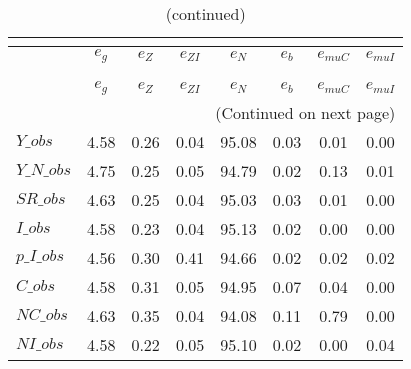  
\begin{center}
\begin{longtable}{lccccccc} 
\caption{VARIANCE DECOMPOSITION (in percent)}\\
 \label{Table:th_var_decomp_uncond}\\
\toprule 
$               $	 & 	 $        {e_g}$	 & 	 $        {e_Z}$	 & 	 $     {e_{ZI}}$	 & 	 $        {e_N}$	 & 	 $        {e_b}$	 & 	 $    {e_{muC}}$	 & 	 $    {e_{muI}}$\\
\midrule \endfirsthead 
\caption{(continued)}\\
 \toprule \\ 
$               $	 & 	 $        {e_g}$	 & 	 $        {e_Z}$	 & 	 $     {e_{ZI}}$	 & 	 $        {e_N}$	 & 	 $        {e_b}$	 & 	 $    {e_{muC}}$	 & 	 $    {e_{muI}}$\\
\midrule \endhead 
\midrule \multicolumn{8}{r}{(Continued on next page)} \\ \bottomrule \endfoot 
\bottomrule \endlastfoot 
$Y\_obs         $	 & 	         4.58	 & 	         0.26	 & 	         0.04	 & 	        95.08	 & 	         0.03	 & 	         0.01	 & 	         0.00 \\ 
$Y\_N\_obs      $	 & 	         4.75	 & 	         0.25	 & 	         0.05	 & 	        94.79	 & 	         0.02	 & 	         0.13	 & 	         0.01 \\ 
$SR\_obs        $	 & 	         4.63	 & 	         0.25	 & 	         0.04	 & 	        95.03	 & 	         0.03	 & 	         0.01	 & 	         0.00 \\ 
$I\_obs         $	 & 	         4.58	 & 	         0.23	 & 	         0.04	 & 	        95.13	 & 	         0.02	 & 	         0.00	 & 	         0.00 \\ 
$p\_I\_obs      $	 & 	         4.56	 & 	         0.30	 & 	         0.41	 & 	        94.66	 & 	         0.02	 & 	         0.02	 & 	         0.02 \\ 
$C\_obs         $	 & 	         4.58	 & 	         0.31	 & 	         0.05	 & 	        94.95	 & 	         0.07	 & 	         0.04	 & 	         0.00 \\ 
$NC\_obs        $	 & 	         4.63	 & 	         0.35	 & 	         0.04	 & 	        94.08	 & 	         0.11	 & 	         0.79	 & 	         0.00 \\ 
$NI\_obs        $	 & 	         4.58	 & 	         0.22	 & 	         0.05	 & 	        95.10	 & 	         0.02	 & 	         0.00	 & 	         0.04 \\ 

\end{longtable}
\end{center}
